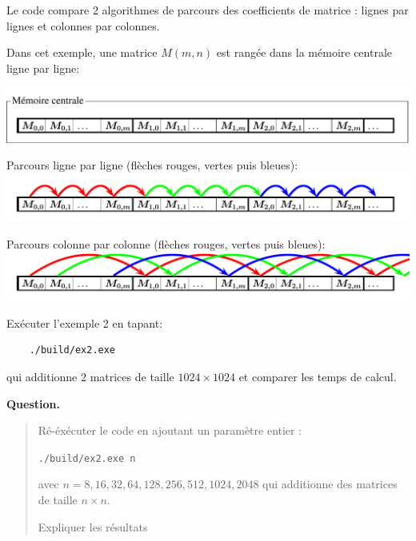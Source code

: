 \documentclass{beamer}
\begin{document}
\begin{frame}
	Le code compare 2 algorithmes de parcours des coefficients de matrice : lignes par lignes et colonnes par colonnes.
	\vfill
	
	Dans cet exemple, une matrice $M(m,n)$ est rangée dans la mémoire centrale ligne par ligne:
	
	\includegraphics[scale=0.4]{../../Images/ex2_memoire}
	
	Parcours ligne par ligne (flèches rouges, vertes puis bleues):
	\includegraphics[scale=0.4]{../../Images/ex2_memoire_1}
	
	Parcours colonne par colonne (flèches rouges, vertes puis bleues):
	\includegraphics[scale=0.4]{../../Images/ex2_memoire_2}
\end{frame}

\begin{frame}[fragile]
	Exécuter l'exemple 2 en tapant:
	\begin{verbatim}
	./build/ex2.exe
	\end{verbatim}
	qui additionne 2 matrices de taille $1024 \times 1024$
	et comparer les temps de calcul.
	\vfill
	
	{\bf Question.}
	\begin{quote}
		Ré-éxécuter le code en ajoutant un paramètre entier :

			\quad\verb|./build/ex2.exe n|

		avec $n = 8, 16, 32, 64, 128, 256, 512, 1024, 2048$
		qui additionne des matrices de taille $n\times n$.
		\bigskip
		
		Expliquer les résultats		
	\end{quote}
	
\end{frame}
\end{document}
